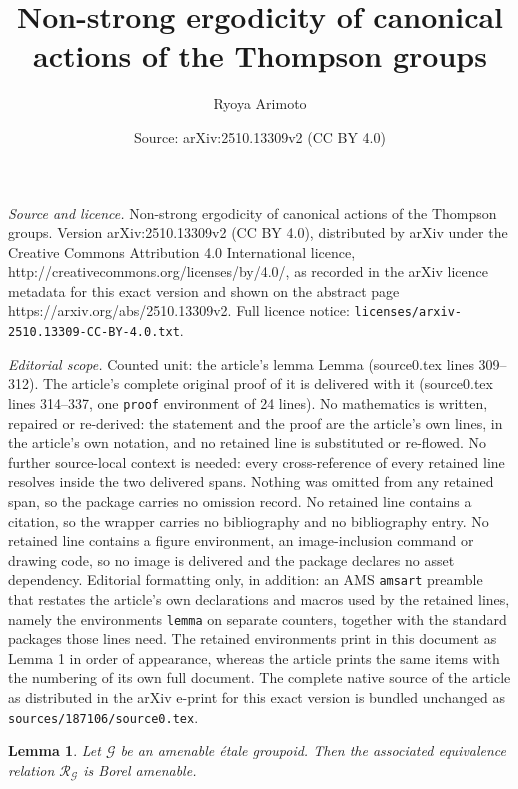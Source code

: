 \documentclass[10pt,a4paper]{amsart}
\title{Non-strong ergodicity of canonical actions of the Thompson groups}
\author{Ryoya Arimoto}
\date{Source: arXiv:2510.13309v2 (CC BY 4.0)}
\newtheorem{lemma}{Lemma}
\newcommand{\G}{\mathcal{G}}
\newcommand{\R}{\mathcal{R}}
\begin{document}
\maketitle

\noindent\emph{Source and licence.} Non-strong ergodicity of canonical actions of the Thompson groups. Version arXiv:2510.13309v2 (CC BY 4.0), distributed by arXiv under the Creative Commons Attribution 4.0 International licence, http://creativecommons.org/licenses/by/4.0/, as recorded in the arXiv licence metadata for this exact version and shown on the abstract page https://arxiv.org/abs/2510.13309v2. Full licence notice: \texttt{licenses/arxiv-2510.13309-CC-BY-4.0.txt}.\par\smallskip

\noindent\textit{Editorial scope.} Counted unit: the article's lemma Lemma (source0.tex lines 309--312). The article's complete original proof of it is delivered with it (source0.tex lines 314--337, one \texttt{proof} environment of 24 lines). No mathematics is written, repaired or re-derived: the statement and the proof are the article's own lines, in the article's own notation, and no retained line is substituted or re-flowed.  No further source-local context is needed: every cross-reference of every retained line resolves inside the two delivered spans.  Nothing was omitted from any retained span, so the package carries no omission record.  No retained line contains a citation, so the wrapper carries no bibliography and no bibliography entry.  No retained line contains a figure environment, an image-inclusion command or drawing code, so no image is delivered and the package declares no asset dependency.  Editorial formatting only, in addition: an AMS \texttt{amsart} preamble that restates the article's own declarations and macros used by the retained lines, namely the environments \texttt{lemma} on separate counters, together with the standard packages those lines need.  The retained environments print in this document as Lemma 1 in order of appearance, whereas the article prints the same items with the numbering of its own full document.  The complete native source of the article as distributed in the arXiv e-print for this exact version is bundled unchanged as \texttt{sources/187106/source0.tex}.
\begin{lemma}\label{Lemma}
Let $\G$ be an amenable \'etale groupoid.
Then the associated equivalence relation $\R _\G$ is Borel amenable.
\end{lemma}
\end{document}
